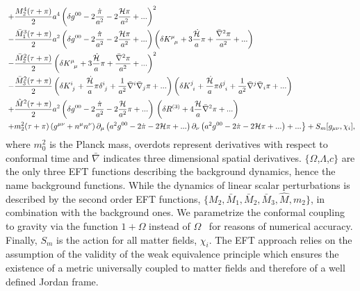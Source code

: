 \documentclass[prd,nofootinbib,showpacs]{revtex4}
\def\hub{{\mathcal H}}
\newcommand{\SDer}{\bar{\nabla}}
\begin{document}
{\begin{align}
 &\left. + \frac{M_2^4 (\tau + \pi)}{2}a^4 \left(\delta g^{00} - 2 \frac{\dot{\pi}}{a^2}-2\frac{\hub\pi}{a^2}+... \right)^2 \right. \nonumber\\
& \left.- \frac{\bar{M}_1^3 (\tau + \pi)}{2}a^2 \left(\delta g^{00}- 2 \frac{\dot{\pi}}{a^2}-2\frac{\hub\pi}{a^2}+... \right) \left(\delta 
\tensor{K}{^\mu_\mu} + 3 \frac{\dot{\hub}}{a} \pi + \frac{\SDer^2 \pi}{a^2}+ ...\right) \right. \nonumber \\
&\left. - \frac{\bar{M}_2^2 (\tau + \pi)}{2} \left(\delta \tensor{K}{^\mu_\mu} + 3 \frac{\dot{\hub}}{a} \pi + \frac{\bar{\nabla}^2 \pi}{a^2} + ... \right)^2 \right.\nonumber  \\
& \left. - \frac{\bar{M}_3^2 (\tau + \pi)}{2}
  \left(\delta \tensor{K}{^i_j} + \frac{\dot{\hub}}{a} \pi \delta\indices{^i_j}
  + \frac{1}{a^2} \bar{\nabla}^i \bar{\nabla}_j \pi +... \right)
  \left(\delta \tensor{K}{^j_i} + \frac{\dot{\hub}}{a} \pi \delta\indices{^j_i}
  + \frac{1}{a^2} \SDer^j \SDer_i \pi + ... \right) \nonumber \right. \\
&  \left. + \frac{\hat{M}^2 (\tau + \pi)}{2} a^2 \left(\delta g^{00} - 2 \frac{\dot{\pi}}{a^2} - 2\frac{\hub}{a^2}\pi + ... \right)\, \left(\delta R^{(3)} +4\frac{\hub}{a} \bar{\nabla}^2\pi + ...\right)\right. \nonumber \\
&\left. + m_2^2(\tau+\pi)\left(g^{\mu\nu}+n^{\mu} n^{\nu}\right)\partial_{\mu}\left(a^2g^{00}-2\dot{\pi} -2\hub\pi + ...\right)\partial_{\nu}\left(a^2g^{00}-2\dot{\pi} - 2\hub\pi + ...\right) + ...\right\}  + S_{m} [g_{\mu \nu},\chi_i],
\end{align}
where $m_0^2$ is the Planck mass, overdots represent derivatives with respect to conformal time and $\bar{\nabla}$ indicates three dimensional spatial derivatives. $\{\Omega$,$\Lambda$,$c\}$ are the only three EFT functions describing the background dynamics, hence the name background functions. While the dynamics of linear scalar perturbations is described by the second order EFT functions, $\{M_2,\bar{M}_1,\bar{M}_2,\bar{M}_3,\hat{M},m_2\}$, in combination with the background ones. We parametrize the conformal coupling to gravity via the function $1+\Omega$ instead of $\Omega$~\cite{Gubitosi:2012hu,Bloomfield:2012ff} for reasons of numerical accuracy. Finally, $S_m$ is the action for all matter fields, $\chi_i$. The EFT approach relies on the assumption  of the validity of  the weak equivalence principle which ensures the existence of a metric universally coupled to matter fields and therefore of a well defined Jordan frame.

}
\end{document}
